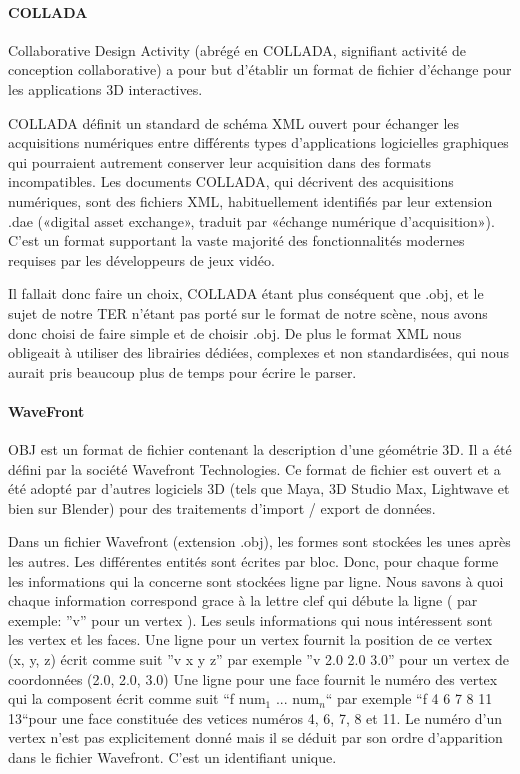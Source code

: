 \documentclass[a4paper,12pt]{report}
\begin{document}
\paragraph{COLLADA}

Collaborative Design Activity (abrégé en COLLADA, signifiant activité de conception collaborative) a pour but d'établir un format de fichier d'échange pour les applications 3D interactives.

COLLADA définit un standard de schéma XML ouvert pour échanger les acquisitions numériques entre différents types d'applications logicielles graphiques qui pourraient autrement conserver leur acquisition dans des formats incompatibles. Les documents COLLADA, qui décrivent des acquisitions numériques, sont des fichiers XML, habituellement identifiés par leur extension .dae («digital asset exchange», traduit par «échange numérique d'acquisition»).
C'est un format supportant la vaste majorité des fonctionnalités modernes
requises par les développeurs de jeux vidéo. 

Il fallait donc faire un choix, COLLADA étant plus conséquent que .obj, et le sujet de notre TER n'étant pas porté sur le format de notre scène, 
nous avons donc choisi de faire simple et de choisir .obj. De plus le format XML nous obligeait à utiliser des librairies dédiées, complexes et non standardisées, qui nous aurait pris beaucoup plus de temps pour écrire le parser.

\paragraph{WaveFront}

OBJ est un format de fichier contenant la description d'une géométrie 3D. Il a été défini par la société Wavefront Technologies. Ce format de fichier est ouvert et a été adopté par d'autres logiciels 3D (tels que Maya, 3D Studio Max, Lightwave et bien sur Blender) pour des traitements d'import / export de données.

Dans un fichier Wavefront (extension .obj), les formes sont stockées les unes après les autres. Les différentes entités sont écrites par bloc.
Donc, pour chaque forme les informations qui la concerne sont stockées ligne par ligne. Nous savons à quoi chaque information correspond grace à la lettre clef qui débute la ligne ( par exemple: ''v'' pour un vertex ).
Les seuls informations qui nous intéressent sont les vertex et les faces. 
Une ligne pour un vertex fournit la position de ce vertex (x, y, z) écrit comme suit ''v x y z'' par exemple ''v 2.0 2.0 3.0'' pour un vertex de coordonnées (2.0, 2.0, 3.0)
Une ligne pour une face fournit le numéro des vertex qui la composent écrit comme suit ``f num$_{1}$ ... num$_{n}$`` par exemple ``f 4 6 7 8 11 13``pour une face constituée des vetices numéros 4, 6, 7, 8 et 11. Le numéro d'un vertex n'est pas explicitement donné mais il se déduit par son ordre d'apparition dans le fichier Wavefront. C'est un identifiant unique.
\end{document}

